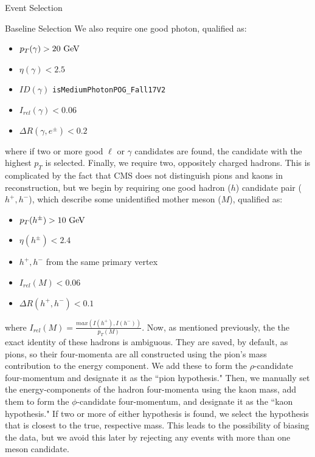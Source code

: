 \begin{section}{Event Selection}
\begin{subsection}{Baseline Selection}
\noindent We also require one good photon, qualified as:
\begin{itemize}
    \item $p_{T}(\gamma) > 20\textnormal{ GeV}$
    \item $\eta(\gamma) < 2.5$
    \item $ID(\gamma)$ \verb|isMediumPhotonPOG_Fall17V2|
    \item $I_{rel}(\gamma) < 0.06$
    \item $\Delta R(\gamma, e^{\pm}) < 0.2$
\end{itemize}
\noindent where if two or more good $\ell$ or $\gamma$ candidates are found, the candidate with the highest $p_{T}$ is selected. Finally, we require two, oppositely charged hadrons. This is complicated by the fact that CMS does not distinguish pions and kaons in reconstruction, but we begin by requiring one good hadron ($h$) candidate pair ($h^{+}, h^{-}$), which describe some unidentified mother meson ($M$), qualified as:
\begin{itemize}
    \item $p_{T}(h^{\pm}) > 10\textnormal{ GeV}$
    \item $\eta(h^{\pm}) < 2.4$
    \item $h^{+}, h^{-}$ from the same primary vertex
    \item $I_{rel}(M) < 0.06$
    \item $\Delta R(h^{+}, h^{-}) < 0.1$
\end{itemize}
\noindent where $I_{rel}(M) = \frac{max(I(h^{+}), I(h^{-}))}{p_{T}(M)}$. Now, as mentioned previously, the the exact identity of these hadrons is ambiguous. They are saved, by default, as pions, so their four-momenta are all constructed using the pion's mass contribution to the energy component. We add these to form the $\rho$-candidate four-momentum and designate it as the ``pion hypothesis." Then, we manually set the energy-components of the hadron four-momenta using the kaon mass, add them to form the $\phi$-candidate four-momentum, and designate it as the ``kaon hypothesis." If two or more of either hypothesis is found, we select the hypothesis that is closest to the true, respective mass. This leads to the possibility of biasing the data, but we avoid this later by rejecting any events with more than one meson candidate.
\end{subsection}
\end{section}

